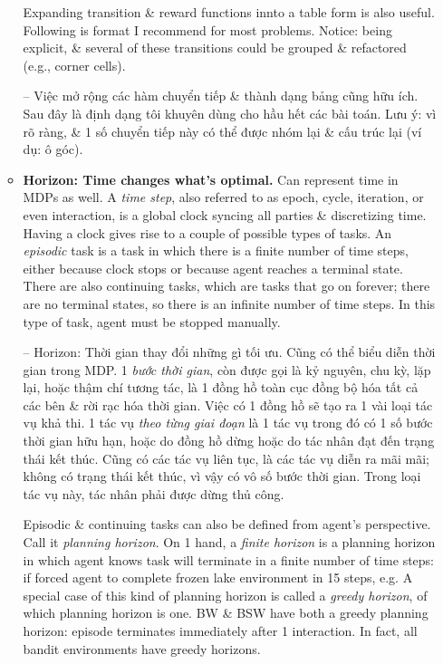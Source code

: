 \documentclass{article}
\begin{document}
\begin{itemize}
\begin{itemize}
        Expanding transition \& reward functions innto a table form is also useful. Following is format I recommend for most problems. Notice: being explicit, \& several of these transitions could be grouped \& refactored (e.g., corner cells).

        -- Việc mở rộng các hàm chuyển tiếp \& thành dạng bảng cũng hữu ích. Sau đây là định dạng tôi khuyên dùng cho hầu hết các bài toán. Lưu ý: vì rõ ràng, \& 1 số chuyển tiếp này có thể được nhóm lại \& cấu trúc lại (ví dụ: ô góc).
        \item {\bf Horizon: Time changes what's optimal.} Can represent time in MDPs as well. A {\it time step}, also referred to as epoch, cycle, iteration, or even interaction, is a global clock syncing all parties \& discretizing time. Having a clock gives rise to a couple of possible types of tasks. An {\it episodic} task is a task in which there is a finite number of time steps, either because clock stops or because agent reaches a terminal state. There are also continuing tasks, which are tasks that go on forever; there are no terminal states, so there is an infinite number of time steps. In this type of task, agent must be stopped manually.

        -- {\sf Horizon: Thời gian thay đổi những gì tối ưu.} Cũng có thể biểu diễn thời gian trong MDP. 1 {\it bước thời gian}, còn được gọi là kỷ nguyên, chu kỳ, lặp lại, hoặc thậm chí tương tác, là 1 đồng hồ toàn cục đồng bộ hóa tất cả các bên \& rời rạc hóa thời gian. Việc có 1 đồng hồ sẽ tạo ra 1 vài loại tác vụ khả thi. 1 tác vụ {\it theo từng giai đoạn} là 1 tác vụ trong đó có 1 số bước thời gian hữu hạn, hoặc do đồng hồ dừng hoặc do tác nhân đạt đến trạng thái kết thúc. Cũng có các tác vụ liên tục, là các tác vụ diễn ra mãi mãi; không có trạng thái kết thúc, vì vậy có vô số bước thời gian. Trong loại tác vụ này, tác nhân phải được dừng thủ công.

        Episodic \& continuing tasks can also be defined from agent's perspective. Call it {\it planning horizon}. On 1 hand, a {\it finite horizon} is a planning horizon in which agent knows task will terminate in a finite number of time steps: if forced agent to complete frozen lake environment in 15 steps, e.g. A special case of this kind of planning horizon is called a {\it greedy horizon}, of which planning horizon is one. BW \& BSW have both a greedy planning horizon: episode terminates immediately after 1 interaction. In fact, all bandit environments have greedy horizons.


\end{itemize}
\end{itemize}
\end{document}
